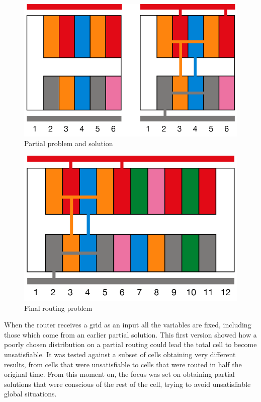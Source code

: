 \begin{figure}[h!]
  \centering
  \includegraphics[scale=0.5]{img/design/MitjaC++.png}
  \caption{Partial problem and solution}
  \label{fig:C++mitja}
\end{figure} 

\begin{figure}[h!]
  \centering
  \includegraphics[scale=0.5]{img/design/CompletaplenaC++.png}
  \caption{Final routing problem}
  \label{fig:C++plena}
\end{figure} 


When the router receives a grid as an input all the variables are fixed, including those which come from an earlier partial solution. This first version showed how a poorly chosen distribution on a partial routing could lead the total cell to become unsatisfiable. It was tested against a subset of cells obtaining very different results, from cells that were unsatisfiable to cells that were routed in half the original time. From this moment on, the focus was set on obtaining partial solutions that were conscious of the rest of the cell, trying to avoid unsatisfiable global situations. \\

